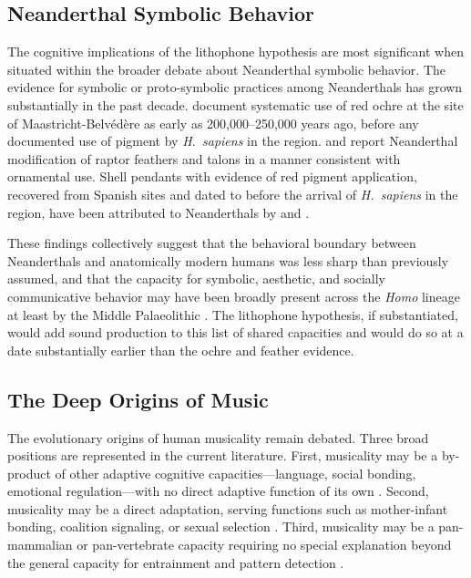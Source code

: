 \documentclass[12pt]{article}
\begin{document}
\subsection{Neanderthal Symbolic Behavior}

The cognitive implications of the lithophone hypothesis are most significant when situated within the broader debate about Neanderthal symbolic behavior. The evidence for symbolic or proto-symbolic practices among Neanderthals has grown substantially in the past decade. \citet{Roebroeks2012} document systematic use of red ochre at the site of Maastricht-Belvédère as early as 200,000--250,000 years ago, before any documented use of pigment by \textit{H.\ sapiens} in the region. \citet{Peresani2011} and \citet{Morin2012} report Neanderthal modification of raptor feathers and talons in a manner consistent with ornamental use. Shell pendants with evidence of red pigment application, recovered from Spanish sites and dated to before the arrival of \textit{H.\ sapiens} in the region, have been attributed to Neanderthals by \citet{Zilhao2010} and \citet{Radovčić2015}.

These findings collectively suggest that the behavioral boundary between Neanderthals and anatomically modern humans was less sharp than previously assumed, and that the capacity for symbolic, aesthetic, and socially communicative behavior may have been broadly present across the \textit{Homo} lineage at least by the Middle Palaeolithic \citep{Stringer2012}. The lithophone hypothesis, if substantiated, would add sound production to this list of shared capacities and would do so at a date substantially earlier than the ochre and feather evidence.

\subsection{The Deep Origins of Music}

The evolutionary origins of human musicality remain debated. Three broad positions are represented in the current literature. First, musicality may be a by-product of other adaptive cognitive capacities—language, social bonding, emotional regulation—with no direct adaptive function of its own \citep{Pinker1997}. Second, musicality may be a direct adaptation, serving functions such as mother-infant bonding, coalition signaling, or sexual selection \citep{Dissanayake2000, Miller2000, Fitch2006}. Third, musicality may be a pan-mammalian or pan-vertebrate capacity requiring no special explanation beyond the general capacity for entrainment and pattern detection \citep{Patel2008}.
\end{document}
